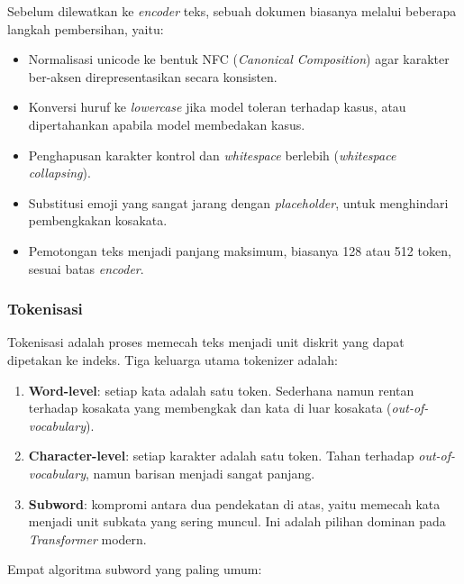 Sebelum dilewatkan ke \textit{encoder} teks, sebuah dokumen biasanya melalui beberapa langkah pembersihan, yaitu:

\begin{itemize}
    \item Normalisasi unicode ke bentuk NFC (\textit{Canonical Composition}) agar karakter ber-aksen direpresentasikan secara konsisten.
    \item Konversi huruf ke \textit{lowercase} jika model toleran terhadap kasus, atau dipertahankan apabila model membedakan kasus.
    \item Penghapusan karakter kontrol dan \textit{whitespace} berlebih (\textit{whitespace collapsing}).
    \item Substitusi emoji yang sangat jarang dengan \textit{placeholder}, untuk menghindari pembengkakan kosakata.
    \item Pemotongan teks menjadi panjang maksimum, biasanya 128 atau 512 token, sesuai batas \textit{encoder}.
\end{itemize}

\subsubsection{Tokenisasi}

Tokenisasi adalah proses memecah teks menjadi unit diskrit yang dapat dipetakan ke indeks. Tiga keluarga utama tokenizer adalah:

\begin{enumerate}
    \item \textbf{Word-level}: setiap kata adalah satu token. Sederhana namun rentan terhadap kosakata yang membengkak dan kata di luar kosakata (\textit{out-of-vocabulary}).
    \item \textbf{Character-level}: setiap karakter adalah satu token. Tahan terhadap \textit{out-of-vocabulary}, namun barisan menjadi sangat panjang.
    \item \textbf{Subword}: kompromi antara dua pendekatan di atas, yaitu memecah kata menjadi unit subkata yang sering muncul. Ini adalah pilihan dominan pada \textit{Transformer} modern.
\end{enumerate}

Empat algoritma subword yang paling umum:

